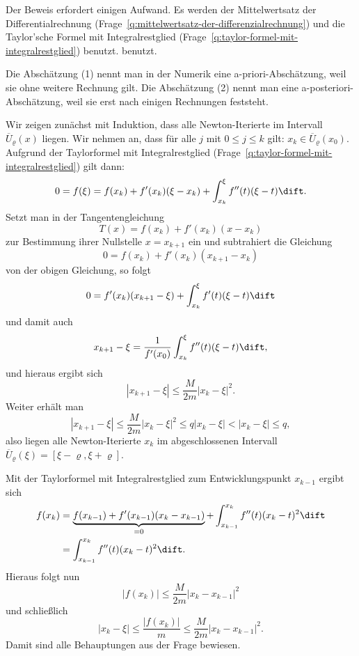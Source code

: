 \begin{antwort}
  Der Beweis erfordert einigen Aufwand. Es werden der Mittelwertsatz der 
  Differentialrechnung (Frage~\ref{q:mittelwertsatz-der-differenzialrechnung}) 
  und die Taylor'sche Formel mit Integralrestglied 
  (Frage~\ref{q:taylor-formel-mit-integralrestglied}) benutzt. 
  benutzt.

  Die Abschätzung (1) nennt man in der Numerik eine a-priori-Abschätzung, weil 
  sie ohne weitere Rechnung gilt. Die Abschätzung (2) nennt man eine 
  a-posteriori-Abschätzung, weil sie erst nach einigen Rechnungen feststeht. 

  Wir zeigen zunächst mit Induktion, dass alle Newton-Iterierte im Intervall 
  $\overline{U}_\varrho (x)$ liegen. Wir nehmen an, dass für alle $j$ mit 
  $0\le j\le k$ gilt: $x_k \in \overline{U}_\varrho (x_0)$. Aufgrund der 
  Taylorformel mit Integralrestglied (Frage~\ref{q:taylor-formel-mit-integralrestglied}) gilt dann:
  \[
  0 = f(\xi) = f(x_k) + f'(x_k) (\xi-x_k) + \int_{x_k}^{\xi} f''(t) (\xi-t) \dift. 
  \]
  Setzt man in der \glqq Tangentengleichung\grqq 
  \[
  T(x) = f(x_k) + f'(x_k) (x-x_k) 
  \]
  zur Bestimmung ihrer Nullstelle $x=x_{k+1}$ ein und subtrahiert 
  die Gleichung 
  \[
  0 = f(x_k) + f'(x_k) (x_{k+1} - x_k)
  \]
  von der obigen Gleichung, so folgt
  \[
  0 = f'(x_k) (x_{k+1}-\xi) +
  \int_{x_k}^{\xi} f'(t) (\xi-t) \dift
  \]
  und damit auch
  \[
  x_{k+1}-\xi = \frac{1}{f'(x_0)} \int_{x_k}^{\xi} f''(t) (\xi-t) \dift,
  \]
  und hieraus ergibt sich
  \[
  |x_{k+1}-\xi| \le \frac{M} {2m} |x_k-\xi|^2.
  \]
  Weiter erhält man 
  \[
  |x_{k+1} - \xi | \le \frac{M}{2m} 
  \left| x_k-\xi \right|^2 \le q \left| x_k-\xi \right| < \left| x_k-\xi \right| \le 
  q,
  \]
  also liegen alle Newton-Iterierte $x_k$ im abgeschlossenen Intervall 
  $\overline{U}_\varrho (\xi) = \left[\xi-\varrho, \xi+\varrho \right]$.
    
  Mit der Taylorformel mit Integralrestglied zum Entwicklungspunkt 
  $x_{k-1}$ ergibt sich
  \begin{align*}
    f(x_k) &= \underbrace{f(x_{k-1}) + f'(x_{k-1}) (x_k-x_{k-1})}_{=0} 
    + \int_{x_{k-1}}^{x_k} f''(t) (x_k -t ) ^2 \dift \\
    &=\int_{x_{k-1}}^{x_k} f''(t) (x_k-t)^2 \dift.
  \end{align*}
  Hieraus folgt nun
  \[
  \left| f(x_k) \right| \le \frac{M}{2m} \left| x_k-x_{k-1} \right|^2
  \]
  und schließlich
  \[
  \left| x_k-\xi \right| \le \frac{\left| f(x_k) \right|}{m} \le 
  \frac{M}{2m} \left| x_k-x_{k-1} \right|^2 .
  \]
  Damit sind alle Behauptungen aus der Frage bewiesen.



\end{antwort}
